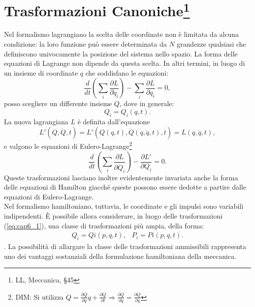 \section[Trasformazioni Canoniche]{Trasformazioni Canoniche\footnote{LL, Meccanica, \S 45}}
Nel formalismo lagrangiano la scelta delle coordinate non \`e limitata da alcuna condizione: la loro funzione pu\`o essere determinata da $N$ grandezze qualsiasi che definiscono univocamente la posizione del sistema nello spazio. La forma delle equazioni di Lagrange non dipende da questa scelta. In altri termini, in luogo di un insieme di coordinate $q$ che soddisfano le equazioni:
\begin{equation}
\frac{d}{dt}  \left( \sum_i\frac{\partial L}{\partial \dot{q}_i} \right) - \sum_i \frac{\partial L}{\partial q_i} = 0 ,
\end{equation}
posso scegliere un differente insieme $Q$, dove in generale:
\begin{equation}
Q_i = Q_i(q,t) .
\label{eq:cap6_1}
\end{equation}
La nuova lagrangiana $L$ \`e definita dall'equazione
\begin{equation}
L'(Q,\dot{Q},t) = L'\left(Q(q,t), \dot {Q}(q, \dot{q}, t), t \right) = L(q,\dot{q},t) ,
\end{equation}
e valgono le equazioni di Eulero-Lagrange\footnote{DIM: Si utilizza $\dot{Q} = \frac{\partial Q}{\partial q}\dot{q} + \frac{\partial Q}{\partial t} \Rightarrow \frac{\partial \dot{Q}}{\partial \dot{q}} = \frac{\partial Q}{\partial q}$ }
\begin{equation}
\frac{d}{dt} \left( \sum_i \frac{\partial L}{\partial \dot{Q}_i} \right) - \frac{\partial L'}{\partial Q_i} = 0 .
\end{equation}
Queste trasformazioni lasciano inoltre evidentemente invariata anche la forma delle equazioni di Hamilton giacch\'e queste possono essere dedotte a partire dalle equazioni di Eulero-Lagrange.\\
Nel formalismo hamiltoniano, tuttavia, le coordinate e gli impulsi sono variabili indipendenti. \`E possibile allora considerare, in luogo delle trasformazioni (\ref{eq:cap6_1}), una classe di trasformazioni pi\`u ampia, della forma:
\begin{equation}
\begin{matrix}
Q_i = Qi(p,q,t),  & P_i = Pi(p,q,t) .
\end{matrix}
\label{eq:cap6_2}
\end{equation}.
La possibilit\`a di allargare la classe delle trasformazioni ammissibili rappresenta uno dei vantaggi sostanziali della formulazione hamiltoniana della meccanica.
